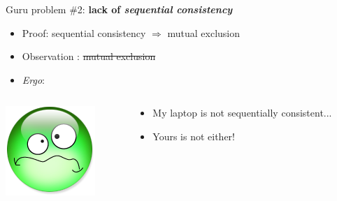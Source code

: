 \documentclass[xcolor={x11names,svgnames},x11names,svgnames]{beamer}
\begin{document}

\begin{frame}[label=peterson_report1]

  \begin{block}{Guru problem \#2: \textbf{lack of \emph{sequential consistency}}}

    \begin{itemize}
    \item Proof: sequential consistency $\Rightarrow$ mutual exclusion
    \item Observation : \sout{mutual exclusion}
    \item \textit{Ergo}: 
    \end{itemize}
    
    \begin{columns}[c]
    \begin{column}{.1\textwidth}
      \includegraphics[width=\textwidth]{triste.png}
    \end{column}
    \begin{column}{.9\textwidth}
      \begin{itemize}
      \item My laptop is not sequentially consistent...
        \pause
      \item Yours is not either!
      \end{itemize}
    \end{column}
  \end{columns}

\end{block}
\end{frame}
\end{document}

